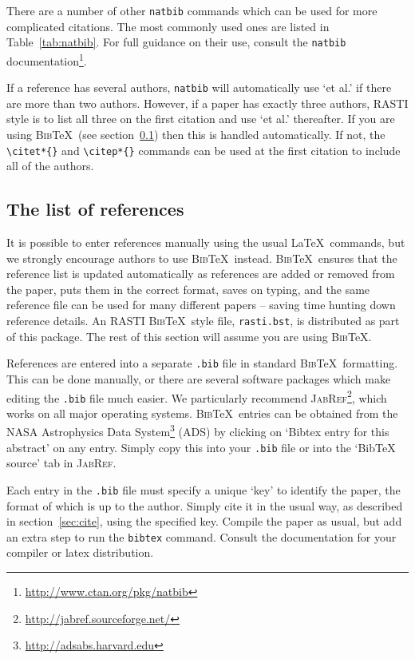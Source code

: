 \documentclass[fleqn,usenatbib,useAMS]{rasti}
\newcommand{\bibtex}{\textsc{Bib}\!\TeX} %
\begin{document}
There are a number of other \verb'natbib' commands which can be used for more complicated citations.
The most commonly used ones are listed in Table~\ref{tab:natbib}.
For full guidance on their use, consult the \verb'natbib' documentation\footnote{\url{http://www.ctan.org/pkg/natbib}}.

If a reference has several authors, \verb'natbib' will automatically use `et al.' if there are more than two authors. However, if a paper has exactly three authors, RASTI style is to list all three on the first citation and use `et al.' thereafter. If you are using \bibtex\ (see section~\ref{sec:ref_list}) then this is handled automatically. If not, the \verb'\citet*{}' and \verb'\citep*{}' commands can be used at the first citation to include all of the authors.

\subsection{The list of references}
\label{sec:ref_list}

It is possible to enter references manually using the usual \LaTeX\ commands, but we strongly encourage authors to use \bibtex\ instead.
\bibtex\ ensures that the reference list is updated automatically as references are added or removed from the paper, puts them in the correct format, saves on typing, and the same reference file can be used for many different papers -- saving time hunting down reference details.
An RASTI \bibtex\ style file, \verb'rasti.bst', is distributed as part of this package.
The rest of this section will assume you are using \bibtex.

References are entered into a separate \verb'.bib' file in standard \bibtex\ formatting.
This can be done manually, or there are several software packages which make editing the \verb'.bib' file much easier.
We particularly recommend \textsc{JabRef}\footnote{\url{http://jabref.sourceforge.net/}}, which works on all major operating systems.
\bibtex\ entries can be obtained from the NASA Astrophysics Data System\footnote{\label{foot:ads}\url{http://adsabs.harvard.edu}} (ADS) by clicking on `Bibtex entry for this abstract' on any entry.
Simply copy this into your \verb'.bib' file or into the `BibTeX source' tab in \textsc{JabRef}.

Each entry in the \verb'.bib' file must specify a unique `key' to identify the paper, the format of which is up to the author.
Simply cite it in the usual way, as described in section~\ref{sec:cite}, using the specified key.
Compile the paper as usual, but add an extra step to run the \texttt{bibtex} command.
Consult the documentation for your compiler or latex distribution.
\end{document}

